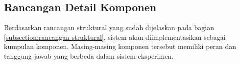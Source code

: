 \subsection{Rancangan Detail Komponen}
\label{subsection:detail-komponen}

Berdasarkan rancangan struktural yang sudah dijelaskan pada bagian \ref{subsection:rancangan-struktural}, sistem akan diimplementasikan sebagai kumpulan komponen. Masing-masing komponen tersebut memiliki peran dan tanggung jawab yang berbeda dalam sistem eksperimen.










